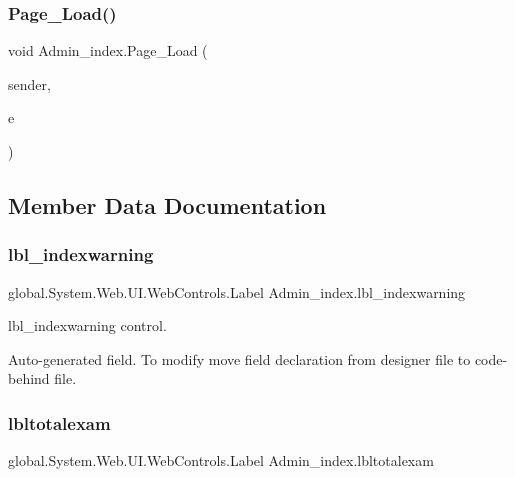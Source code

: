 \subsubsection{\texorpdfstring{Page\_Load()}{Page\_Load()}}
{\footnotesize\ttfamily void Admin\+\_\+index.\+Page\+\_\+\+Load (\begin{DoxyParamCaption}\item[{object}]{sender,  }\item[{Event\+Args}]{e }\end{DoxyParamCaption})\hspace{0.3cm}{\ttfamily [protected]}}



\subsection{Member Data Documentation}
\mbox{\label{class_admin__index_a5efbc5fc285148f44deffad3c5352394}} 
\subsubsection{\texorpdfstring{lbl\_indexwarning}{lbl\_indexwarning}}
{\footnotesize\ttfamily global.\+System.\+Web.\+U\+I.\+Web\+Controls.\+Label Admin\+\_\+index.\+lbl\+\_\+indexwarning\hspace{0.3cm}{\ttfamily [protected]}}



lbl\+\_\+indexwarning control. 

Auto-\/generated field. To modify move field declaration from designer file to code-\/behind file. \mbox{\label{class_admin__index_a95a7c92d6bac34ae125cee9156e569f7}} 
\subsubsection{\texorpdfstring{lbltotalexam}{lbltotalexam}}
{\footnotesize\ttfamily global.\+System.\+Web.\+U\+I.\+Web\+Controls.\+Label Admin\+\_\+index.\+lbltotalexam\hspace{0.3cm}{\ttfamily [protected]}}



